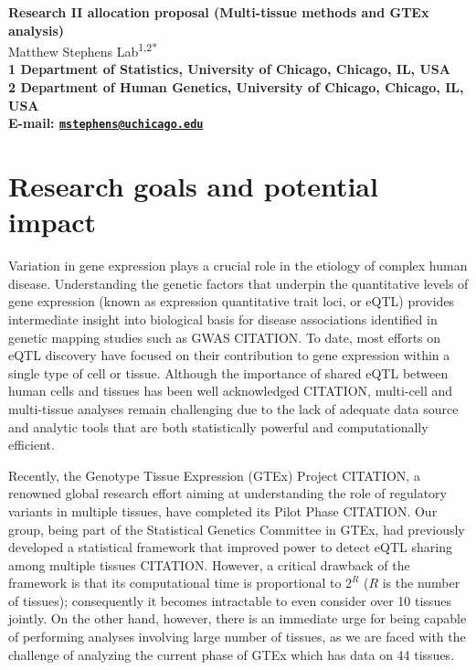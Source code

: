 \documentclass[10pt]{article}
\date{}
\begin{document}
\begin{flushleft}
{\Large
\textbf{Research II allocation proposal (Multi-tissue methods and GTEx analysis)}
}
\\
  Matthew Stephens Lab\textsuperscript{1,2*}\\
\bf{1} Department of Statistics, University of Chicago,  Chicago,  IL,  USA
\\
\bf{2} Department of Human Genetics, University of Chicago,  Chicago,  IL,  USA
\\

\textasteriskcentered{} E-mail:   \href{mailto:mstephens@uchicago.edu}{\nolinkurl{mstephens@uchicago.edu}}

\end{flushleft}

\section*{Research goals and potential
impact}\label{research-goals-and-the-potential-impact}
Variation in gene expression plays a crucial role in the etiology of complex human disease.
Understanding the genetic factors that underpin the quantitative levels of gene expression (known as expression quantitative trait loci, or eQTL) provides intermediate insight into biological basis for disease associations identified in genetic mapping studies such as GWAS CITATION. 
To date, most efforts on eQTL discovery have focused on their contribution to gene expression within a single type of cell or tissue. 
Although the importance of shared eQTL between human cells and tissues has been well acknowledged CITATION, multi-cell and multi-tissue analyses remain challenging due to the lack of adequate data source and analytic tools that are both statistically powerful and computationally efficient.

Recently, the Genotype Tissue Expression (GTEx) Project CITATION, a renowned global research effort aiming at understanding the role of regulatory variants in multiple tissues, have completed its Pilot Phase CITATION.
Our group, being part of the Statistical Genetics Committee in GTEx, had previously developed a statistical framework that improved power to detect
eQTL sharing among multiple tissues CITATION. 
However, a critical drawback of the framework is that its computational time is proportional to $2^R$ ($R$ is the number of tissues); consequently it becomes intractable to even consider over 10 tissues jointly. 
On the other hand, however, there is an immediate urge for being capable of performing analyses involving large number of tissues, as we are faced with the challenge of analyzing the current phase of GTEx which has data on 44 tissues.
\end{document}
